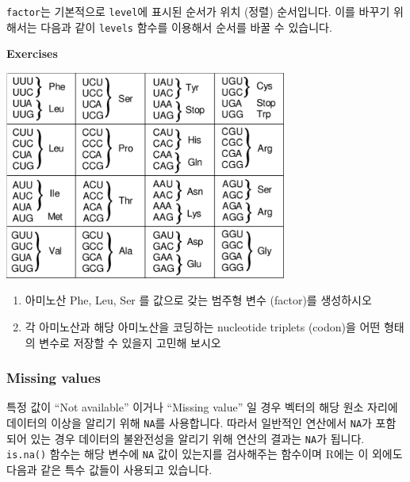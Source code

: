 \documentclass[
  a4paper,
]{book}
\newenvironment{Shaded}{\begin{snugshade}}{\end{snugshade}}
\newcommand{\FunctionTok}[1]{\textcolor[rgb]{0.28,0.35,0.67}{#1}}
\newcommand{\NormalTok}[1]{\textcolor[rgb]{0.00,0.23,0.31}{#1}}
\newcommand{\OtherTok}[1]{\textcolor[rgb]{0.00,0.23,0.31}{#1}}
\newcommand{\SpecialCharTok}[1]{\textcolor[rgb]{0.37,0.37,0.37}{#1}}
\newcommand{\StringTok}[1]{\textcolor[rgb]{0.13,0.47,0.30}{#1}}
\begin{document}
\texttt{factor}는 기본적으로 \texttt{level}에 표시된 순서가 위치 (정렬)
순서입니다. 이를 바꾸기 위해서는 다음과 같이 \texttt{levels} 함수를
이용해서 순서를 바꿀 수 있습니다.

\begin{Shaded}
\end{Shaded}

\textbf{Exercises}

\includegraphics[width=3.64583in,height=\textheight]{images/03/codon_table.png}

\begin{enumerate}
\def\labelenumi{\arabic{enumi})}
\item
  아미노산 Phe, Leu, Ser 를 값으로 갖는 범주형 변수 (factor)를
  생성하시오
\item
  각 아미노산과 해당 아미노산을 코딩하는 nucleotide triplets (codon)을
  어떤 형태의 변수로 저장할 수 있을지 고민해 보시오
\end{enumerate}

\hypertarget{missing-values}{%
\subsubsection{Missing values}\label{missing-values}}

특정 값이 ``Not available'' 이거나 ``Missing value'' 일 경우 벡터의 해당
원소 자리에 데이터의 이상을 알리기 위해 \texttt{NA}를 사용합니다. 따라서
일반적인 연산에서 \texttt{NA}가 포함되어 있는 경우 데이터의 불완전성을
알리기 위해 연산의 결과는 \texttt{NA}가 됩니다. \texttt{is.na()} 함수는
해당 변수에 \texttt{NA} 값이 있는지를 검사해주는 함수이며 R에는 이
외에도 다음과 같은 특수 값들이 사용되고 있습니다.
\end{document}
